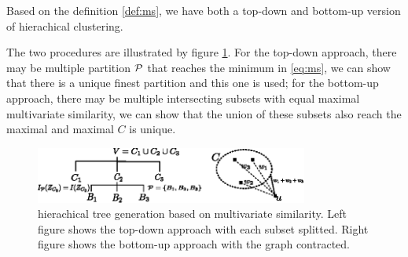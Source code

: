 \documentclass{article}
\begin{document}
Based on the definition \eqref{def:ms}, we have both a top-down and bottom-up version of hierachical clustering.


The two procedures are illustrated by figure \ref{fig:ta}. For the top-down approach, there may be multiple partition $\P$ that reaches the minimum in \eqref{eq:ms}, we can show that there is a unique finest partition and this one is used; for the bottom-up approach, there may be multiple intersecting subsets with equal maximal multivariate similarity, we can show that the union of these subsets also reach the maximal and maximal $C$ is unique.
\begin{figure}
\centering
\includegraphics[width=0.8\textwidth]{two_approach.eps}
\caption{hierachical tree generation based on multivariate similarity. Left figure shows the top-down approach with each subset splitted. Right figure shows the bottom-up approach with the graph contracted.}\label{fig:ta}
\end{figure}
\end{document}
